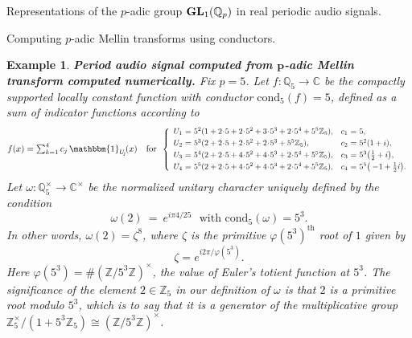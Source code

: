\documentclass[letterpaper,11pt, reqno]{amsart}
\newtheorem{monodromy theorem}{Monodromy Theorem}[subsection]
\newtheorem{wild conjecture}[theorem]{Wild Conjecture}
\newtheorem{research objectives}{Research objectives}[subsection]
\newtheorem{research question}[theorem]{Research questions}
\newtheorem{aside question}[theorem]{Aside question}
\newtheorem{example}[theorem]{Example}
\newtheorem{audio example}[theorem]{\loudspeaker[3] Example}
\newtheorem{blank remark}[theorem]{}
\newtheorem{terminology and comment}[theorem]{Terminology and comment}
\newtheorem{purity hypothesis}[theorem]{Purity hypothesis}
\newtheorem{corollary of the purity hypothesis}[theorem]{Corollary of the purity hypothesis}
\newcommand{\CC} {{\mathbb C}}
\newcommand{\QQ} {{\mathbb Q}}
\newcommand{\ZZ} {{\mathbb Z}}
\newcommand{\lra}{{\longrightarrow}}
\numberwithin{equation}{theorem}
\begin{document}
\begin{section}{Representations of the $p$-adic group $\bold{GL}_{1}(\mathbb{Q}_{p})$
in real periodic audio signals.}
\begin{subsection}{Computing $p$-adic Mellin transforms using conductors.}
\begin{example}
{\bf Period audio signal computed from $\pmb{p}$-adic Mellin transform computed numerically.}
\normalfont
	Fix $p=5$. Let $f:\QQ_5\lra\CC$ be the compactly supported locally constant function with conductor $\text{cond}_5(f)=5$, defined as a sum of indicator functions according to
	\begin{equation}\label{equation: cslc f for Mellin 01}
	\scalebox{.9}{$
	f(x)=\sum^{4}_{k=1}c_{j}\ \!\mathbbm{1}_{U_{\!j}\!}(x)
	\ \ \ \text{for}\ \ 
	\scalebox{.9}{$
	\left\{
	\begin{array}{rclcrcl}
	U_1
	&\!\!\!\!=\!\!\!\!&
	5^{2}(1+2\!\cdot\!5+2\!\cdot\!5^{2}+3\!\cdot\!5^3+2\!\cdot\!5^4+5^5\ZZ_{5}),
	&
	\!\!\!\!\!\!
	&
	c_1
	&\!\!\!\!=\!\!\!\!&
	5,
	\\[3pt]
	U_2
	&\!\!\!\!=\!\!\!\!&
	5^{3}(2+2\!\cdot\!5+2\!\cdot\!5^{2}+2\!\cdot\!5^3+5^5\ZZ_{5}),
	&
	\!\!\!\!\!\!
	&
	c_2
	&\!\!\!\!=\!\!\!\!&
	5^{2}(1+i),
	\\[3pt]
	U_3
	&\!\!\!\!=\!\!\!\!&
	5^{4}(2+2\!\cdot\!5+4\!\cdot\!5^{2}+4\!\cdot\!5^3+2\!\cdot\!5^4+5^5\ZZ_{5}),
	&
	\!\!\!\!\!\!
	&
	c_3
	&\!\!\!\!=\!\!\!\!&
	5^{3}\big(\tfrac{1}{2}+i\big),
	\\[3pt]
	U_4
	&\!\!\!\!=\!\!\!\!&
	5^{5}(2+2\!\cdot\!5+4\!\cdot\!5^{2}+4\!\cdot\!5^3+2\!\cdot\!5^4+5^5\ZZ_{5}),
	&
	\!\!\!\!\!\!
	&
	c_4
	&\!\!\!\!=\!\!\!\!&
	5^{5}\big(-\!1+\tfrac{1}{2}i\big).
	\end{array}
	\right.
	$}
	$}
	\end{equation}
Let $\omega:\QQ^\times_5\lra\CC^\times$ be the normalized unitary character uniquely defined by the condition
	\begin{equation}\label{equation: norm un char for Mellin 00}
	\omega(2)\ =\ e^{i\pi 4/25}
	\ \ \ \text{with cond}_5(\omega)=5^3.
	\end{equation}
In other words, $\omega(2)=\zeta^{8}$, where $\zeta$ is the primitive $\varphi(5^3)^\text{th}$ root of $1$ given by
	\begin{equation}\label{equation: primitive totienth root}
	\zeta=e^{i2\pi/\varphi(5^3)}.
	\end{equation}
Here $\varphi(5^3)=\#(\ZZ/5^3\ZZ)^\times$, the value of Euler's totient function at $5^3$. The significance of the element $2\in\ZZ_5$ in our definition of $\omega$ is that $2$ is a primitive root modulo $5^3$, which is to say that it is a generator of the multiplicative group $\ZZ^{\times}_5/(1+5^3\ZZ_5)\cong(\ZZ/5^3\ZZ)^\times$.


\end{example}
\end{subsection}
\end{section}
\end{document}
